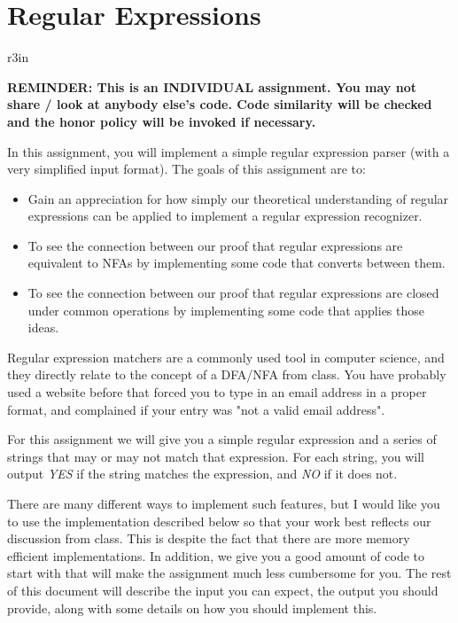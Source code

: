 \documentclass[11pt]{article}
\begin{document}
\section*{Regular Expressions}


\begin{wrapfigure}{r}{3in}
\vspace{-10pt}
\vspace{-30pt}
\end{wrapfigure}

\textbf{REMINDER: This is an INDIVIDUAL assignment. You may not share / look at anybody else's code. Code similarity will be checked and the honor policy will be invoked if necessary.}

In this assignment, you will implement a simple regular expression parser (with a very simplified input format). The goals of this assignment are to:

\begin{itemize}
	\item Gain an appreciation for how simply our theoretical understanding of regular expressions can be applied to implement a regular expression recognizer.
	\item To see the connection between our proof that regular expressions are equivalent to NFAs by implementing some code that converts between them.
	\item To see the connection between our proof that regular expressions are closed under common operations by implementing some code that applies those ideas.
\end{itemize}

Regular expression matchers are a commonly used tool in computer science, and they directly relate to the concept of a DFA/NFA from class. You have probably used a website before that forced you to type in an email address in a proper format, and complained if your entry was "not a valid email address".

For this assignment we will give you a simple regular expression and a series of strings that may or may not match that expression. For each string, you will output \emph{YES} if the string matches the expression, and \emph{NO} if it does not.

There are many different ways to implement such features, but I would like you to use the implementation described below so that your work best reflects our discussion from class. This is despite the fact that there are more memory efficient implementations. In addition, we give you a good amount of code to start with that will make the assignment much less cumbersome for you. The rest of this document will describe the input you can expect, the output you should provide, along with some details on how you should implement this.
\end{document}
